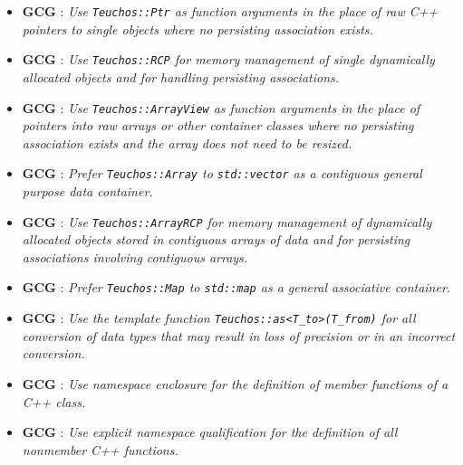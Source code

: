\begin{itemize}
\begin{itemize}
  {}\item{}\textbf{GCG
  {}}: {}\textit{Use {}\texttt{Teuchos::Ptr} as
  function arguments in the place of raw C++ pointers to single objects where
  no persisting association exists.}

  {}\item{}\textbf{GCG
  {}}: {}\textit{Use {}\texttt{Teuchos::RCP} for
  memory management of single dynamically allocated objects and for handling
  persisting {}\cite{RCPBeginnersGuide} associations.}

  {}\item{}\textbf{GCG
  {}}: {}\textit{Use {}\texttt{Teuchos::ArrayView} as
  function arguments in the place of pointers into raw arrays or other
  container classes where no persisting association exists and the array does
  not need to be resized.}

  {}\item{}\textbf{GCG
  {}}: {}\textit{Prefer {}\texttt{Teuchos::Array} to
  {}\texttt{std::vector} as a contiguous general purpose data container.}

  {}\item{}\textbf{GCG
  {}}: {}\textit{Use {}\texttt{Teuchos::ArrayRCP} for
  memory management of dynamically allocated objects stored in contiguous
  arrays of data and for persisting associations involving contiguous arrays.}

  {}\item{}\textbf{GCG
  {}}: {}\textit{Prefer {}\texttt{Teuchos::Map} to
  {}\texttt{std::map} as a general associative container.}

  {}\item{}\textbf{GCG
  {}}: {}\textit{Use the template function
  {}\texttt{Teuchos::as<T\_to>(T\_from)} for all conversion of data types that
  may result in loss of precision or in an incorrect conversion.}

  {}\item{}\textbf{GCG
  {}}: {}\textit{Use namespace enclosure for the
  definition of member functions of a C++ class.}

  {}\item{}\textbf{GCG
  {}}: {}\textit{Use explicit namespace qualification
  for the definition of all nonmember C++ functions.}


\end{itemize}
\end{itemize}
